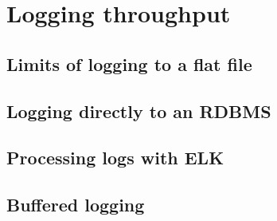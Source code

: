 \section{Logging throughput}

\subsection{Limits of logging to a flat file}

\subsection{Logging directly to an RDBMS}

\subsection{Processing logs with ELK}

\subsection{Buffered logging}